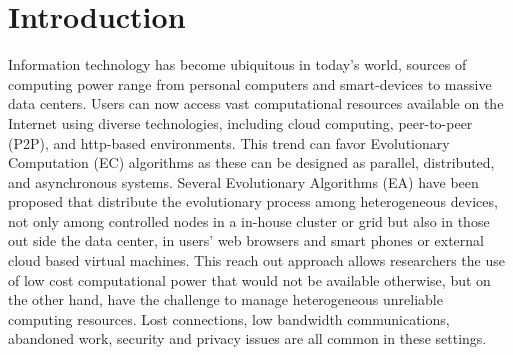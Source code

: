 \documentclass{llncs}
\begin{document}
\section{Introduction}
\label{sec:intro}
Information technology has become ubiquitous in today's world, sources of 
computing power range from personal computers and smart-devices to massive 
data centers. Users can now access vast computational resources available on 
the Internet using diverse technologies, including cloud computing, 
peer-to-peer (P2P), and http-based environments. This trend can favor 
Evolutionary Computation (EC) algorithms as these can be designed as parallel, 
distributed, and asynchronous systems.
Several Evolutionary Algorithms (EA) have been proposed that distribute 
the evolutionary process among heterogeneous devices, not only among controlled
nodes in a in-house cluster or grid but also in those out side the data center,
in users' web browsers and smart phones or external cloud based virtual machines.
This reach out approach allows researchers the use of low cost computational 
power that would not be available otherwise, but on the other hand, have the 
challenge to manage heterogeneous unreliable computing resources. Lost 
connections, low bandwidth communications, abandoned work, security and privacy
issues are all common in these settings. 
\end{document}
